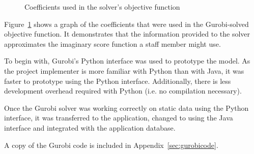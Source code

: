 
\begin{figure}
  \begin{center}
  \end{center}
  \caption{Coefficients used in the solver's objective function}
  \label{gurobi_coeff}
\end{figure}

Figure~\ref{gurobi_coeff} shows a graph of the coefficients that were used in
the Gurobi-solved objective function. It demonstrates that the information
provided to the solver approximates the imaginary score function a staff
member might use.

To begin with, Gurobi's Python interface was used to prototype the model. As
the project implementer is more familiar with Python than with Java, it was
faster to prototype using the Python interface. Additionally, there is less
development overhead required with Python (i.e. no compilation necessary).

Once the Gurobi solver was working correctly on static data using the Python
interface, it was transferred to the application, changed to using the Java
interface and integrated with the application database.

A copy of the Gurobi code is included in Appendix~\ref{sec:gurobicode}.
